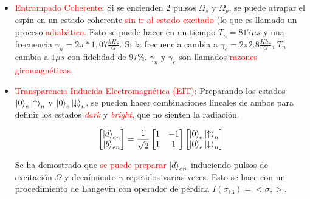 \documentclass{book}
\begin{document}
\begin{itemize}
    \item \textcolor{red}{Entrampado Coherente}: Si se encienden 2 pulsos $\Omega_s$ y $\Omega_p$, se puede atrapar el espín en un estado coherente \textcolor{red}{sin ir al estado excitado} (lo que es llamado un proceso \textcolor{red}{adiabático}. Esto se puede hacer en un tiempo $T_n=817 \mu s$ y una frecuencia $\gamma_n=2\pi*1,07\frac{kHz}{G}$. Si la frecuencia cambia a $\gamma_e=2\pi 2.8\frac{Khz}{G}$, $T_n$ cambia a $1\mu s$ con fidelidad de $97\%$. $\gamma_n$ y $\gamma_e$ son llamados \textcolor{red}{razones giromagnéticas}.
    \item \textcolor{red}{Transparencia Inducida Electromagnética (EIT)}: Preparando los estados  $\ket{0}_e\ket{\uparrow}_n$ y $\ket{0}_e\ket{\downarrow}_n$, se pueden hacer combinaciones lineales de ambos para definir los estados \textcolor{red}{\textit{dark}} y \textcolor{red}{\textit{bright}}, que no sienten la radiación.
    
    \begin{equation}\label{eq8.15}\begin{bmatrix}\ket{d}_{en}\\\ket{b}_{en}\end{bmatrix}=\frac{1}{\sqrt{2}}\begin{bmatrix} 1&-1 \\ 1&1 \end{bmatrix} \begin{bmatrix}\ket{0}_e\ket{\uparrow}_n\\\ket{0}_e\ket{\downarrow}_n\end{bmatrix}\end{equation}
    
    Se ha demostrado que \textcolor{red}{se puede preparar} $\ket{d}_{en}$ induciendo pulsos de excitación $\Omega$ y decaímiento $\gamma$ repetidos varias veces. Esto se hace con un procedimiento de Langevin con operador de pérdida $I(\sigma_{13})=<\sigma_z>$. 
    

\end{itemize}
\end{document}
